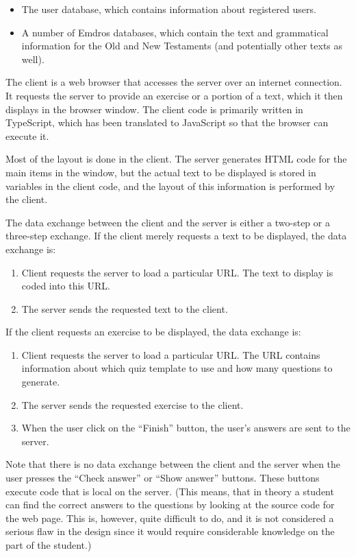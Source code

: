 \documentclass[11pt,oneside,a4paper]{memoir}
\begin{document}
\begin{itemize}
\item The user database, which contains information about registered users.
\item A number of Emdros databases, which contain the text and grammatical information for the Old
  and New Testaments (and potentially other texts as well).
\end{itemize}

The client is a web browser that accesses the server over an internet connection. It requests the
server to provide an exercise or a portion of a text, which it then displays in the browser window.
The client code is primarily written in TypeScript, which has been translated to JavaScript so that
the browser can execute it.

Most of the layout is done in the client. The server generates HTML code for the main items in the
window, but the actual text to be displayed is stored in variables in the client code, and the layout of
this information is performed by the client.

The data exchange between the client and the server is either a two-step or a three-step exchange.
If the client merely requests a text to be displayed, the data exchange is:

\begin{enumerate}
\item Client requests the server to load a particular URL. The text to display is coded into this
  URL.
\item The server sends the requested text to the client.
\end{enumerate}

If the client requests an exercise to be displayed, the data exchange is:

\begin{enumerate}
\item Client requests the server to load a particular URL. The URL contains information about which
  quiz template to use and how many questions to generate.
\item The server sends the requested exercise to the client.
\item When the user click on the ``Finish'' button, the user's answers are sent to the server.
\end{enumerate}

Note that there is no data exchange between the client and the server when the user presses the
``Check answer'' or ``Show answer'' buttons. These buttons execute code that is local on the server.
(This means, that in theory a student can find the correct answers to the questions by looking at
the source code for the web page. This is, however, quite difficult to do, and it is not considered
a serious flaw in the design since it would require considerable knowledge on the part of the student.)
\end{document}
